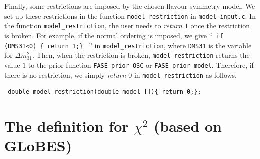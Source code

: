 \documentclass[aps,prd,nofootinbib,preprint]{revtex4}
\begin{document}
Finally, some restrictions are imposed by the chosen flavour symmetry model. We set up these restrictions in the function \texttt{model\_restriction} in \texttt{model-input.c}. In the function \texttt{model\_restriction}, the user needs to \textit{return $1$} once the restriction is broken. For example, if the normal ordering is imposed, we give ``\texttt{ if (DMS31<0) \{ return 1;\} } '' in \texttt{model\_restriction}, where \texttt{DMS31} is the variable for $\Delta m_{31}^2$. Then, when the restriction is broken, \texttt{model\_restriction} returns the value $1$ to the prior function \texttt{FASE\_prior\_OSC} or \texttt{FASE\_prior\_model}. Therefore, if there is no restriction, we simply \textit{return $0$} in \texttt{model\_restriction} as follows.
\begin{verbatim}
 double model_restriction(double model []){ return 0;};
\end{verbatim}


\section{The definition for $\chi^2$ (based on \textbf{GLoBES})}\label{sec:chi-squared}
 
\end{document}
